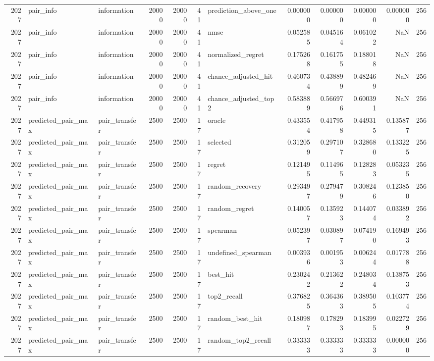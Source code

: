 \begin{tabular}{rllrrrlrrrrr}
2027 & pair_info & information & 20000 & 20000 & 41 & prediction_above_one & 0.000000 & 0.000000 & 0.000000 & 0.000000 & 256 \\
2027 & pair_info & information & 20000 & 20000 & 41 & nmse & 0.052585 & 0.045164 & 0.061022 & NaN & 256 \\
2027 & pair_info & information & 20000 & 20000 & 41 & normalized_regret & 0.175268 & 0.161755 & 0.188018 & NaN & 256 \\
2027 & pair_info & information & 20000 & 20000 & 41 & chance_adjusted_hit & 0.460734 & 0.438899 & 0.482469 & NaN & 256 \\
2027 & pair_info & information & 20000 & 20000 & 41 & chance_adjusted_top2 & 0.583889 & 0.566976 & 0.600391 & NaN & 256 \\
2027 & predicted_pair_max & pair_transfer & 2500 & 2500 & 17 & oracle & 0.433554 & 0.417958 & 0.449315 & 0.135877 & 256 \\
2027 & predicted_pair_max & pair_transfer & 2500 & 2500 & 17 & selected & 0.312059 & 0.297107 & 0.328680 & 0.133225 & 256 \\
2027 & predicted_pair_max & pair_transfer & 2500 & 2500 & 17 & regret & 0.121495 & 0.114965 & 0.128283 & 0.053235 & 256 \\
2027 & predicted_pair_max & pair_transfer & 2500 & 2500 & 17 & random_recovery & 0.293497 & 0.279479 & 0.308246 & 0.123850 & 256 \\
2027 & predicted_pair_max & pair_transfer & 2500 & 2500 & 17 & random_regret & 0.140057 & 0.135923 & 0.144074 & 0.033892 & 256 \\
2027 & predicted_pair_max & pair_transfer & 2500 & 2500 & 17 & spearman & 0.052397 & 0.030897 & 0.074190 & 0.169493 & 256 \\
2027 & predicted_pair_max & pair_transfer & 2500 & 2500 & 17 & undefined_spearman & 0.003936 & 0.001953 & 0.006244 & 0.017788 & 256 \\
2027 & predicted_pair_max & pair_transfer & 2500 & 2500 & 17 & best_hit & 0.230242 & 0.213622 & 0.248034 & 0.138753 & 256 \\
2027 & predicted_pair_max & pair_transfer & 2500 & 2500 & 17 & top2_recall & 0.376825 & 0.364363 & 0.389505 & 0.103774 & 256 \\
2027 & predicted_pair_max & pair_transfer & 2500 & 2500 & 17 & random_best_hit & 0.180987 & 0.178293 & 0.183995 & 0.022729 & 256 \\
2027 & predicted_pair_max & pair_transfer & 2500 & 2500 & 17 & random_top2_recall & 0.333333 & 0.333333 & 0.333333 & 0.000000 & 256 \\

\end{tabular}

